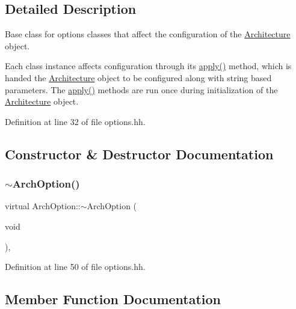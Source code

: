\subsection{Detailed Description}
Base class for options classes that affect the configuration of the \mbox{\hyperlink{class_architecture}{Architecture}} object. 

Each class instance affects configuration through its \mbox{\hyperlink{class_arch_option_a5dc1b3adaee0d11e6018b85640272498}{apply()}} method, which is handed the \mbox{\hyperlink{class_architecture}{Architecture}} object to be configured along with string based parameters. The \mbox{\hyperlink{class_arch_option_a5dc1b3adaee0d11e6018b85640272498}{apply()}} methods are run once during initialization of the \mbox{\hyperlink{class_architecture}{Architecture}} object. 

Definition at line 32 of file options.\+hh.



\subsection{Constructor \& Destructor Documentation}
\mbox{\label{class_arch_option_a84af1d20a7ea91a1f10fc4dd05977165}} 
\subsubsection{\texorpdfstring{$\sim$ArchOption()}{~ArchOption()}}
{\footnotesize\ttfamily virtual Arch\+Option\+::$\sim$\+Arch\+Option (\begin{DoxyParamCaption}\item[{void}]{ }\end{DoxyParamCaption})\hspace{0.3cm}{\ttfamily [inline]}, {\ttfamily [virtual]}}



Definition at line 50 of file options.\+hh.



\subsection{Member Function Documentation}
\mbox{\label{class_arch_option_a5dc1b3adaee0d11e6018b85640272498}} 
